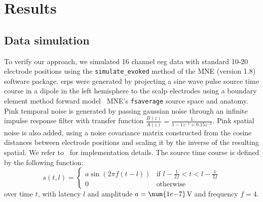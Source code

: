 \section{Results}



\subsection{Data simulation}
To verify our approach, we simulated 16 channel \ac{eeg} data with standard
10-20 electrode positions using the \texttt{simulate\_evoked} method of the
MNE (version 1.8)~\cite{Gramfort2013} software package.
\Acp{erp} were generated by projecting a sine wave pulse source time course in a dipole in the
left hemisphere to the scalp electrodes using a boundary element method forward
model~\cite{Mosher1999} MNE's \texttt{fsaverage} source space and anatomy.
Pink temporal noise is generated by passing gaussian noise through an infinite
impulse response filter with transfer function
$\frac{B(z)}{A(z)} = \frac{1}{1 -1z^{-1}+0.15z^{-2}}$.
Pink spatial noise is also added, using a noise covariance matrix constructed from the
cosine distances between electrode positions and scaling it by the inverse of
the resulting spatial.
We refer to~\textcite{Gramfort2014} for implementation details.
The source time course is defined by the following function:
\begin{equation}
  s(t,l) =
  \begin{cases}
    a\sin\left(2\pi f\left(t-l\right)\right) & \text{if  $l-\frac{1}{2f} < t < l-\frac{1}{2f}$} \\
    0 & \text{otherwise}
  \end{cases}
\end{equation}
over time $t$, with latency $l$ and amplitude $a=\num{1e{-7}}$V and frequency
$f=4$.

